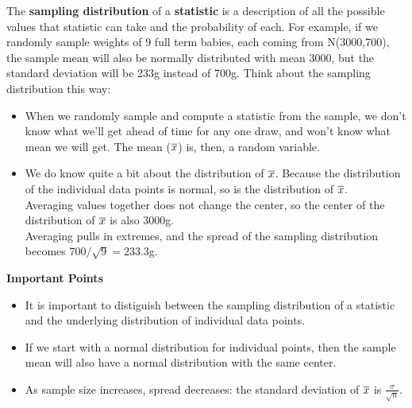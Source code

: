The {\bf sampling distribution} of a {\bf statistic} is a description
of all the possible values that statistic can take and the probability
of each.  For example, if we randomly sample weights of 9 full term
babies, each coming from N(3000,700), the sample mean will also be
normally distributed with mean 3000, but the standard deviation will
be 233g instead of 700g.  Think about the sampling distribution this
way: 
\begin{itemize}
\item When we randomly sample and compute a statistic from the sample,
  we don't know what we'll get ahead of time for any one draw, and
  won't know what mean we will get.  The mean ($\overline{x}$) is, then, a random
  variable.
\item We do know quite a bit about the distribution of $\overline{x}$. Because
  the distribution of the individual data points is normal, so is the
  distribution of $\overline{x}$. \\
  Averaging values together does not change the
  center, so the center of the distribution of $\overline{x}$ is also 3000g.  \\
  Averaging pulls in extremes, and the spread of the sampling
  distribution becomes $700/\sqrt{9} = 233.3$g.
\end{itemize}\vspace{1in}



\begin{center}
  {\large\bf Important Points}
\end{center}

\begin{itemize}
\item  It is important to distiguish between the sampling distribution
  of a statistic and the underlying distribution of individual data
  points.  
\item If we start with a normal distribution for individual points,
  then the sample mean will also have a normal distribution with the
  same center.
\item As sample size increases, spread decreases: the standard
  deviation of $\overline{x}$ is  $\frac{\sigma}{\sqrt{n}}$. 
\end{itemize}


